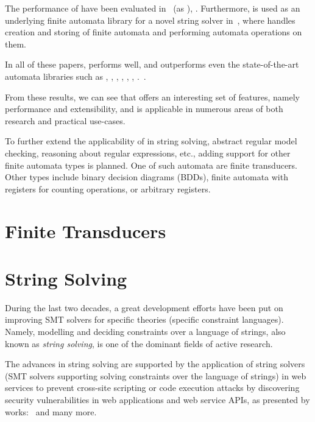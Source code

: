 The performance of \mata have been evaluated in~\cite{cade23_reasoning_regular_properties_comparision_DBLP:conf/cade/FiedorHHRSV23} (as \enfa), \cite{tacas24_mata_10.1007/978-3-031-57249-4_7}.
Furthermore, \mata is used as an underlying finite automata library for a novel string solver \noodler in~\cite{fm23fm23_equations_synergy_regular_constraints_DBLP:conf/fm/BlahoudekCCHHLS23, oopsla23_stabilization_DBLP:journals/pacmpl/ChenCHHLS23,tacas24_noodler_10.1007/978-3-031-57246-3_2}, where \mata handles creation and storing of finite automata and performing automata operations on them.

In all of these papers, \mata performs well, and outperforms even the state-of-the-art automata libraries such as \automatajar, \awali, \vata, \brics, \automatanet, \automatapy, \fado.~\cite{tacas24_mata_10.1007/978-3-031-57249-4_7}.

From these results, we can see that \mata offers an interesting set of features, namely performance and extensibility, and is applicable in numerous areas of both research and practical use-cases.

To further extend the applicability of \mata in string solving, abstract regular model checking, reasoning about regular expressions, etc., adding support for other finite automata types is planned.
One of such automata are finite transducers.
Other types include binary decision diagrams (BDDs), finite automata with registers for counting operations, or arbitrary registers.



\section{Finite Transducers}

\section{String Solving}

During the last two decades, a great development efforts have been put on improving SMT solvers for specific theories (specific constraint languages).
Namely, modelling and deciding constraints over a language of strings, also known as \emph{string solving}, is one of the dominant fields of active research.

The advances in string solving are supported by the application of string solvers (SMT solvers supporting solving constraints over the language of strings) in web services to prevent cross-site scripting or code execution attacks by discovering security vulnerabilities in web applications and web service APIs, as presented by works:~\cite{String_constraints_with_concatenation_and_transducers_solved_efficiently, Composing_Static_and_Dynamic_Analysis_to_Validate_Sanitization_in_Web_Applications, Satisfiability_Modulo_Theories_Introduction_and_Applications, Simple_linear_string_constraints,Z3-str_a_z3-based_string_solver_for_web_application_analysis,S3_A_Symbolic_String_Solver_for_Vulnerability_Detection_in_Web_Applications} and many more.

